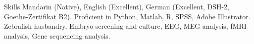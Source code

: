 \begin{rubric}{Skills}
\entry*[Language]
    Mandarin (Native), English (Excellent), German (Excellent, DSH-2, Goethe-Zertifikat B2).
    Proficient in Python, Matlab, R, SPSS, Adobe Illustrator.
    Zebrafish husbandry, Embryo screening and culture, EEG, MEG analysis, fMRI analysis, Gene sequencing analysis.
\end{rubric}